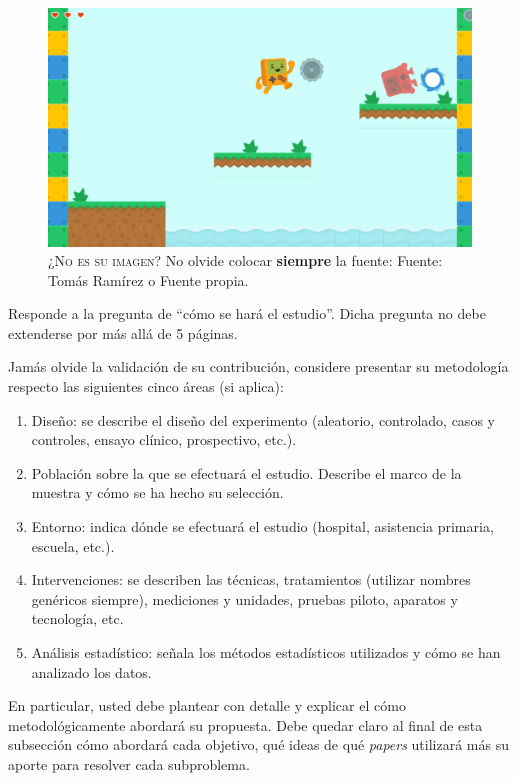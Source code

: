 \begin{figure}[hbtp]
	\centering
	\includegraphics[scale=0.2]{images/gamebase.png}
	\caption{\textsc{¿No es su imagen?} No olvide colocar \textbf{siempre} la fuente: Fuente: Tomás Ramírez o Fuente propia.}
	\label{fig:platformer1}
\end{figure}

Responde a la pregunta de ``cómo se hará el estudio''.  Dicha pregunta no debe extenderse por más allá de 5 páginas.

Jamás olvide la validación de su contribución, considere presentar su metodología respecto las siguientes cinco áreas (si aplica):

\begin{enumerate}
	\item Diseño: se describe el diseño del experimento (aleatorio, controlado, casos y controles, ensayo clínico, prospectivo, etc.).
	\item Población sobre la que se efectuará el estudio. Describe el marco de la muestra y cómo se ha hecho su selección.
	\item Entorno: indica dónde se efectuará el estudio (hospital, asistencia primaria, escuela, etc.).
	\item Intervenciones: se describen las técnicas, tratamientos (utilizar nombres genéricos siempre), mediciones y unidades, pruebas piloto, aparatos y tecnología, etc.
	\item Análisis estadístico: señala los métodos estadísticos utilizados y cómo se han analizado los datos.
\end{enumerate}

En particular, usted debe plantear con detalle y explicar el cómo metodológicamente abordará su propuesta.
Debe quedar claro al final de esta subsección cómo abordará cada objetivo, qué ideas de qué \textit{papers} utilizará más su aporte para resolver cada subproblema.

